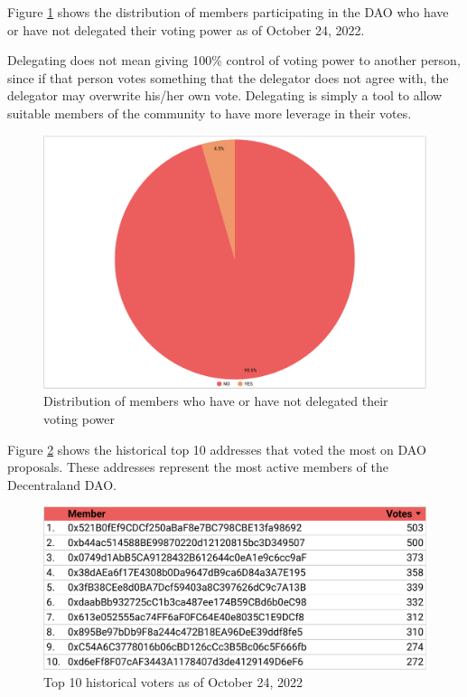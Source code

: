 \documentclass[MSE,Master,english]{twbook}%
\begin{document}
Figure \ref{fig:delegation_ratio} shows the distribution of members participating in the \gls{DAO} who have or have not delegated their voting power as of October 24, 2022. 

Delegating does not mean giving 100\% control of voting power to another person, since if that person votes something that the delegator does not agree with, the delegator may overwrite his/her own vote. Delegating is simply a tool to allow suitable members of the community to have more leverage in their votes.

\begin{figure}[H]
  \centering
  \includegraphics[width=\textwidth]{metrics/delegation_ratio.png}
  \caption{Distribution of members who have or have not delegated their voting power}
  \label{fig:delegation_ratio}
\end{figure}

Figure \ref{fig:top_voters} shows the historical top 10 addresses that voted the most on \gls{DAO} proposals. These addresses represent the most active members of the Decentraland \gls{DAO}.
\begin{figure}[H]
  \centering
  \includegraphics[width=\textwidth]{metrics/top_voters.png}
  \caption{Top 10 historical voters as of October 24, 2022}
  \label{fig:top_voters}
\end{figure}
\end{document}
